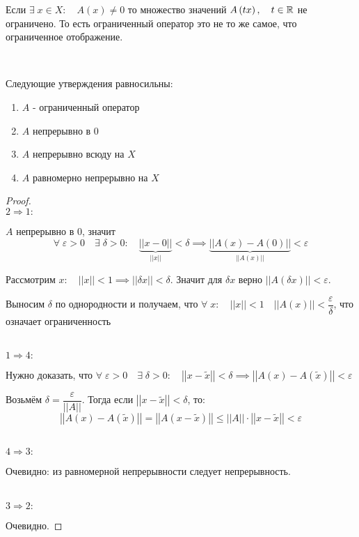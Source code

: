\documentclass[../main.tex]{subfiles}
\begin{document}
Если \( \exists \; x \in X:\quad A\left( x\right) \neq 0\) то множество значений \( A\left( tx\right),\quad t \in \mathbb{R} \) не ограничено. То есть ограниченный оператор это не то же самое, что ограниченное отображение. 

\begin{thm}
    
    ~

    Следующие утверждения равносильны:
    \begin{enumerate}
        \item \( A\) - ограниченный оператор 
        \item \( A\) непрерывно в 0
        \item \( A\) непрерывно всюду на \( X\)
        \item \( A\) равномерно непрерывно на \( X\)
    \end{enumerate}
\end{thm}
\begin{proof}
    
    ~\\
    \( \boxed{ 2\Longrightarrow 1}:\) 

    \( A\) непрерывно в 0, значит 
    \[ \forall \; \varepsilon >0\quad \exists \; \delta >0:\quad \underbrace{\left| \left| x-0\right|\right|}_{\left| \left| x\right|\right|}< \delta \implies \underbrace{\left| \left| A\left( x\right)-A\left( 0\right)\right|\right|}_{\left| \left| A\left( x\right)\right|\right|}< \varepsilon \]

    Рассмотрим \( x:\quad \left| \left| x\right|\right| <1 \implies \left| \left| \delta x\right|\right|< \delta \). Значит для \( \delta x\) верно \( \left| \left| A\left( \delta x\right)\right|\right|< \varepsilon \). 

    Выносим \( \delta \) по однородности и получаем, что \( \forall \; x :\quad \left| \left| x\right|\right|<1\quad  \left| \left| A\left( x\right)\right|\right|< \dfrac{ \varepsilon}{ \delta } \), что означает ограниченность 

    ~\\
    \( \boxed{ 1\Longrightarrow 4}:\) 

    Нужно доказать, что \( \forall \; \varepsilon >0\quad \exists \; \delta >0:\quad \left| \left| x- \tilde{ x}\right|\right|< \delta \implies \left| \left| A\left( x\right)-A\left( \tilde{ x}\right)\right|\right|< \varepsilon \)

    Возьмём \( \delta = \dfrac{ \varepsilon}{ \left| \left| A\right|\right|} \). Тогда если \( \left| \left| x- \tilde{ x}\right|\right|< \delta \), то:
    \[ \left| \left| A\left( x\right)-A\left( \tilde{ x}\right)\right|\right|=\left| \left| A\left( x- \tilde{ x}\right)\right|\right| \leq \left| \left| A\right|\right| \cdot\left| \left| x- \tilde{ x}\right|\right| < \varepsilon \]

    ~\\
    \( \boxed{ 4\Longrightarrow 3}:\) 

    Очевидно: из равномерной непрерывности следует непрерывность. 

    ~\\
    \( \boxed{ 3\Longrightarrow 2}:\) 

    Очевидно.
\end{proof}
\end{document}

